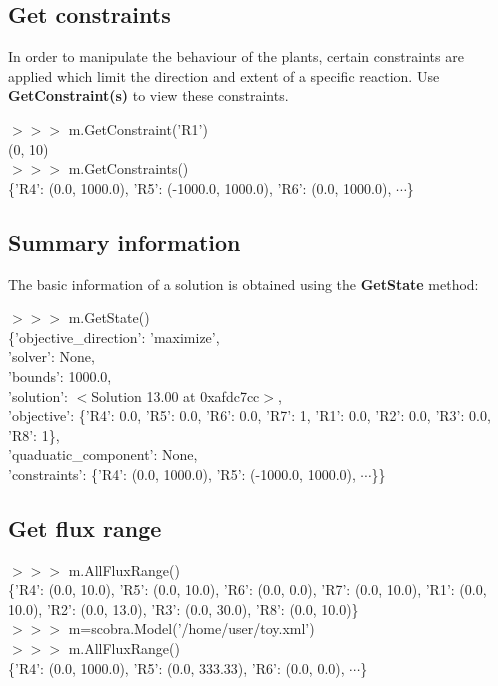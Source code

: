 
\subsection{Get constraints}

In order to manipulate the behaviour of the plants, certain constraints are applied which limit the direction and extent of a specific reaction. Use \textbf{GetConstraint(s)} to view these constraints.

\begin{framed}
$>>>$ m.GetConstraint('R1')\\
(0, 10)\\

$>>>$ m.GetConstraints()\\
\{'R4': (0.0, 1000.0), 'R5': (-1000.0, 1000.0), 'R6': (0.0, 1000.0), $\cdots$\}
\end{framed}


\subsection{Summary information}
The basic information of a solution is obtained using the \textbf{GetState} method:

\begin{framed}
$>>>$ m.GetState()\\
\{'objective\_direction': 'maximize',\\
'solver': None,\\
'bounds': 1000.0,\\
'solution': $<$Solution 13.00 at 0xafdc7cc$>$,\\ 
'objective': \{'R4': 0.0, 'R5': 0.0, 'R6': 0.0, 'R7': 1, 'R1': 0.0, 'R2': 0.0, 'R3': 0.0, 'R8': 1\},\\
'quaduatic\_component': None,\\
'constraints': \{'R4': (0.0, 1000.0), 'R5': (-1000.0, 1000.0), $\cdots$\}\}
\end{framed}


\subsection{Get flux range}

\begin{framed}
$>>>$ m.AllFluxRange()\\
\{'R4': (0.0, 10.0), 'R5': (0.0, 10.0), 'R6': (0.0, 0.0), 'R7': (0.0, 10.0), 'R1': (0.0, 10.0), 'R2': (0.0, 13.0), 'R3': (0.0, 30.0), 'R8': (0.0, 10.0)\}\\

$>>>$ m=scobra.Model('/home/user/toy.xml')\\
$>>>$ m.AllFluxRange()\\
\{'R4': (0.0, 1000.0), 'R5': (0.0, 333.33), 'R6': (0.0, 0.0), $\cdots$\}
\end{framed}

